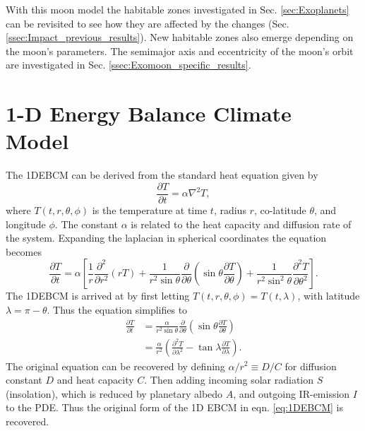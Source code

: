 \documentclass[12pt, onecolumn]{revtex4-2}    %
\newcommand{\partialderiv}[2]{\frac{\partial {#1}}{\partial {#2}}}
\newcommand{\partialderivsecnd}[2]{\frac{\partial^2 {#1}}{\partial {#2}^2}}
\begin{document}
With this moon model the habitable zones investigated in Sec. \ref{sec:Exoplanets} can be revisited to see how they are affected by the changes (Sec. \ref{ssec:Impact_previous_results}).
New habitable zones also emerge depending on the moon's parameters.
The semimajor axis and eccentricity of the moon's orbit are investigated in Sec. \ref{ssec:Exomoon_specific_results}.

\section{1-D Energy Balance Climate Model}\label{sec:1DEBCM}
%
The 1DEBCM can be derived from the standard heat equation given by
\begin{equation}
  \partialderiv{T}{t} = \alpha \nabla^2 T,
  \label{eq:heat_eqn}
\end{equation}
where $T(t, r, \theta, \phi)$ is the temperature at time $t$, radius $r$, co-latitude $\theta$, and longitude $\phi$.
The constant $\alpha$ is related to the heat capacity and diffusion rate of the system.
Expanding the laplacian in spherical coordinates the equation becomes
\begin{equation}
  \partialderiv{T}{t} = \alpha \left[\frac{1}{r} \partialderivsecnd{}{r} (r T)
    + \frac{1}{r^2 \sin\theta} \partialderiv{}{\theta}\left(\sin\theta \partialderiv{T}{\theta}\right)
    + \frac{1}{r^2 \sin^2\theta} \partialderivsecnd{T}{\theta} \right]. 
    \label{eq:FullyExpandedHeatEqn}
\end{equation}
The 1DEBCM is arrived at by first letting $T(t, r, \theta, \phi) = T(t, \lambda)$, with latitude $\lambda = \pi - \theta$. Thus the equation simplifies to
\begin{equation}
  \begin{split}
    \partialderiv{T}{t} & = \frac{\alpha}{r^2 \sin\theta} \partialderiv{}{\theta}\left(\sin\theta \partialderiv{T}{\theta}\right)   \\
                        & = \frac{\alpha}{r^2} \left(\partialderivsecnd{T}{\lambda} - \tan\lambda \partialderiv{T}{\lambda}\right).
  \end{split}
  \label{eq:1DEBCM_kernel}
\end{equation}
The original equation can be recovered by defining $\alpha / r^2 \equiv D / C$ for diffusion constant $D$ and heat capacity $C$.
Then adding incoming solar radiation $S$ (insolation), which is reduced by planetary albedo $A$, and outgoing IR-emission $I$ to the PDE.
Thus the original form of the 1D EBCM in eqn. \eqref{eq:1DEBCM} is recovered.
\end{document}
